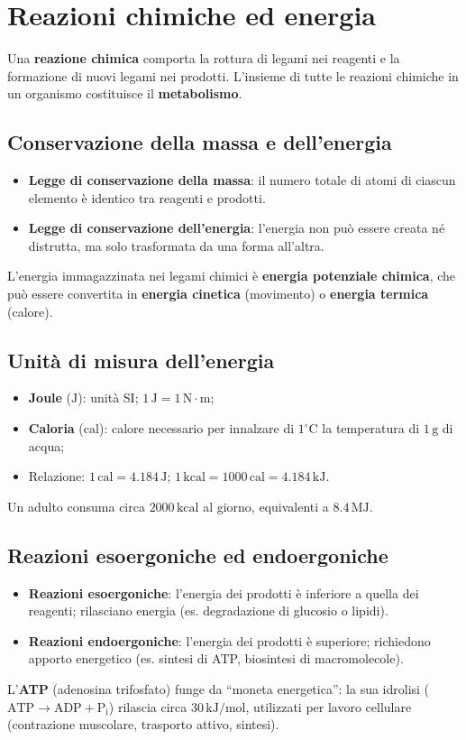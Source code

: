 \documentclass[12pt,a4paper]{report}
\begin{document}
\section{Reazioni chimiche ed energia}
Una \textbf{reazione chimica} comporta la rottura di legami nei reagenti e la formazione di nuovi legami nei prodotti. L'insieme di tutte le reazioni chimiche in un organismo costituisce il \textbf{metabolismo}.
\subsection{Conservazione della massa e dell'energia}
\begin{itemize}
\item \textbf{Legge di conservazione della massa}: il numero totale di atomi di ciascun elemento è identico tra reagenti e prodotti.
\item \textbf{Legge di conservazione dell'energia}: l'energia non può essere creata né distrutta, ma solo trasformata da una forma all'altra.
\end{itemize}
L'energia immagazzinata nei legami chimici è \textbf{energia potenziale chimica}, che può essere convertita in \textbf{energia cinetica} (movimento) o \textbf{energia termica} (calore).
\subsection{Unità di misura dell'energia}
\begin{itemize}
\item \textbf{Joule} (\(\mathrm{J}\)): unità SI; \(1\,\mathrm{J} = 1\,\mathrm{N \cdot m}\);
\item \textbf{Caloria} (\(\mathrm{cal}\)): calore necessario per innalzare di \(1^\circ\mathrm{C}\) la temperatura di \(1\,\mathrm{g}\) di acqua;
\item Relazione: \(1\,\mathrm{cal} = 4.184\,\mathrm{J}\); \(1\,\mathrm{kcal} = 1000\,\mathrm{cal} = 4.184\,\mathrm{kJ}\).
\end{itemize}
Un adulto consuma circa \(2000\,\mathrm{kcal}\) al giorno, equivalenti a \(8.4\,\mathrm{MJ}\).
\subsection{Reazioni esoergoniche ed endoergoniche}
\begin{itemize}
\item \textbf{Reazioni esoergoniche}: l'energia dei prodotti è inferiore a quella dei reagenti; rilasciano energia (es. degradazione di glucosio o lipidi).
\item \textbf{Reazioni endoergoniche}: l'energia dei prodotti è superiore; richiedono apporto energetico (es. sintesi di ATP, biosintesi di macromolecole).
\end{itemize}
L'\textbf{ATP} (adenosina trifosfato) funge da ``moneta energetica'': la sua idrolisi (\(\mathrm{ATP \rightarrow ADP + P_i}\)) rilascia circa \(30\,\mathrm{kJ/mol}\), utilizzati per lavoro cellulare (contrazione muscolare, trasporto attivo, sintesi).
\end{document}
